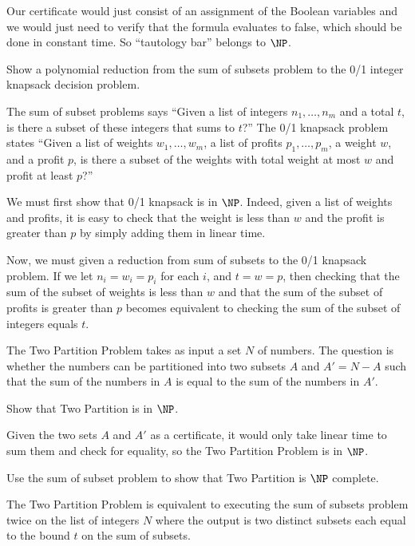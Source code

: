\documentclass[12pt,letterpaper,twoside]{hmcpset}
\begin{document}
\begin{solution}
 Our certificate would just consist of an assignment of the Boolean variables and we would just need to verify that the formula evaluates to false, which should be done in constant time.  So ``tautology bar'' belongs to $\NP$.
\end{solution}

\begin{problem}[5]
 Show a polynomial reduction from the sum of subsets problem to the 0/1 integer knapsack decision problem.
\end{problem}

\begin{solution}
 The sum of subset problems says ``Given a list of integers $n_1,\dotsc,n_m$ and a total $t$, is there a subset of these integers that sums to $t$?''  The 0/1 knapsack problem states ``Given a list of weights $w_1,\dotsc,w_m$, a list of profits $p_1,\dotsc,p_m$, a weight $w$, and a profit $p$, is there a subset of the weights with total weight at most $w$ and profit at least $p$?''
 
 We must first show that 0/1 knapsack is in $\NP$.  Indeed, given a list of weights and profits, it is easy to check that the weight is less than $w$ and the profit is greater than $p$ by simply adding them in linear time.
 
 Now, we must given a reduction from sum of subsets to the 0/1 knapsack problem.  If we let $n_i = w_i = p_i$ for each $i$, and $t = w = p$, then checking that the sum of the subset of weights is less than $w$ and that the sum of the subset of profits is greater than $p$ becomes equivalent to checking the sum of the subset of integers equals $t$.
\end{solution}


\begin{problem}[6]
 The Two Partition Problem takes as input a set $N$ of numbers. The question is whether the numbers can be partitioned into two subsets $A$ and $A'=N-A$ such that the sum of the numbers in \(A\) is equal to the sum of the numbers in \(A'\). 
\end{problem}

\begin{problem}[6a]
 Show that Two Partition is in $\NP$.
\end{problem}

\begin{solution}
 Given the two sets $A$ and $A'$ as a certificate, it would only take linear time to sum them and check for equality, so the Two Partition Problem is in $\NP$.
\end{solution}

\begin{problem}[6b]
 Use the sum of subset problem to show that Two Partition is $\NP$ complete.
\end{problem}

\begin{solution}
 The Two Partition Problem is equivalent to executing the sum of subsets problem twice on the list of integers $N$ where the output is two distinct subsets each equal to the bound $t$ on the sum of subsets.
\end{solution}
\end{document}

